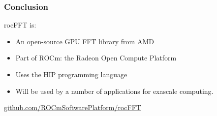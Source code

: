 \documentclass[10pt,aspectratio=169]{beamer}
\begin{document}
\begin{frame}[fragile]
  \frametitle{Conclusion}

  \begin{center}
    rocFFT is:
  \end{center}
  \bigskip
  \begin{itemize}
  \item An open-source GPU FFT library from AMD
  \medskip
  \item Part of ROCm: the Radeon Open Compute Platform
  \medskip
  \item Uses the HIP programming language
  \medskip
  \item Will be used by a number of applications for exascale computing.
  \end{itemize}

  \bigskip
  \begin{center}
    \url{github.com/ROCmSoftwarePlatform/rocFFT}
  \end{center}
  
\end{frame}
\end{document}
